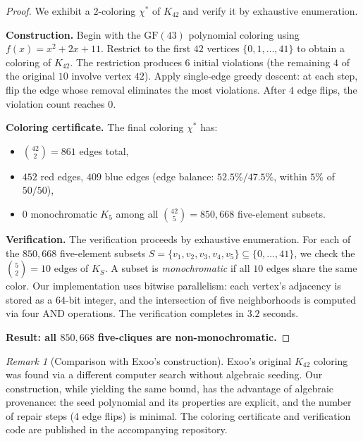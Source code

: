 \documentclass[12pt,a4paper]{article}
\theoremstyle{definition}
\theoremstyle{remark}
\newtheorem{remark}[theorem]{Remark}
\newcommand{\GF}[1]{\mathrm{GF}(#1)}
\newcommand{\Kn}[1]{K_{#1}}
\begin{document}
\begin{proof}
We exhibit a $2$-coloring $\chi^*$ of $\Kn{42}$ and verify it by exhaustive enumeration.

\medskip
\noindent\textbf{Construction.}  Begin with the $\GF{43}$ polynomial coloring using $f(x) = x^2 + 2x + 11$.  Restrict to the first $42$ vertices $\{0, 1, \ldots, 41\}$ to obtain a coloring of $\Kn{42}$.  The restriction produces $6$ initial violations (the remaining $4$ of the original $10$ involve vertex $42$).  Apply single-edge greedy descent: at each step, flip the edge whose removal eliminates the most violations.  After $4$ edge flips, the violation count reaches $0$.

\medskip
\noindent\textbf{Coloring certificate.}  The final coloring $\chi^*$ has:
\begin{itemize}[nosep]
    \item $\binom{42}{2} = 861$ edges total,
    \item $452$ red edges, $409$ blue edges (edge balance: $52.5\%/47.5\%$, within $5\%$ of $50/50$),
    \item $0$ monochromatic $K_5$ among all $\binom{42}{5} = 850{,}668$ five-element subsets.
\end{itemize}

\medskip
\noindent\textbf{Verification.}  The verification proceeds by exhaustive enumeration.  For each of the $850{,}668$ five-element subsets $S = \{v_1, v_2, v_3, v_4, v_5\} \subseteq \{0, \ldots, 41\}$, we check the $\binom{5}{2} = 10$ edges of $K_S$.  A subset is \emph{monochromatic} if all $10$ edges share the same color.  Our implementation uses bitwise parallelism: each vertex's adjacency is stored as a $64$-bit integer, and the intersection of five neighborhoods is computed via four AND operations.  The verification completes in $3.2$ seconds.

\medskip
\noindent\textbf{Result: all $850{,}668$ five-cliques are non-monochromatic.}  \qedhere
\end{proof}

\begin{remark}[Comparison with Exoo's construction]\label{rem:exoo}
Exoo's original $\Kn{42}$ coloring~\cite{exoo1989} was found via a different computer search without algebraic seeding.  Our construction, while yielding the same bound, has the advantage of algebraic provenance: the seed polynomial and its properties are explicit, and the number of repair steps (4 edge flips) is minimal.  The coloring certificate and verification code are published in the accompanying repository.
\end{remark}
\end{document}
